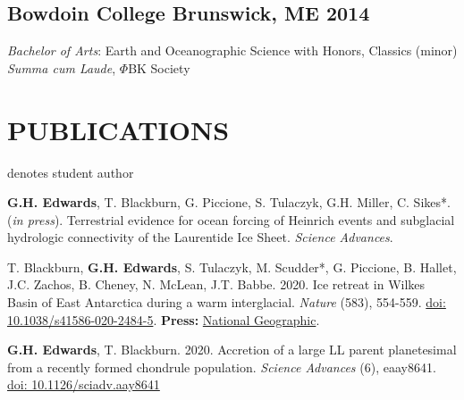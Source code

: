 \documentclass[10pt]{article}
\newcommand{\ghedwards}{\textbf{G.H. Edwards}}
\begin{document}
\subsection*{\textbf{Bowdoin College} \hspace{15pt} Brunswick, ME \hfill 2014}
\textit{Bachelor of Arts}: Earth and Oceanographic Science with Honors, Classics (minor) \\
\textit{Summa cum Laude}, $\Phi$BK Society


\section*{PUBLICATIONS}
\hfill* denotes student author
\begin{etaremune} [itemsep=4pt, leftmargin=3ex]
\item \ghedwards, T. Blackburn, G. Piccione, S. Tulaczyk, G.H. Miller, C. Sikes*. (\textit{in press}). Terrestrial evidence for ocean forcing of Heinrich events and subglacial hydrologic connectivity of the Laurentide Ice Sheet. \textit{Science Advances}.
\item T. Blackburn, \ghedwards, S. Tulaczyk, M. Scudder*, G. Piccione, B. Hallet, J.C. Zachos, B. Cheney, N. McLean, J.T. Babbe. 2020. Ice retreat in Wilkes Basin of East Antarctica during a warm interglacial. \textit{Nature} (583), 554-559. \href{https://doi.org/10.1038/s41586-020-2484-5}{doi: 10.1038/s41586-020-2484-5}. \textbf{Press:} \href{https://www.nationalgeographic.com/science/2020/07/east-antarctic-ice-sheet-more-vulnerable-to-melting-than-thought/}{National Geographic}.
\item \ghedwards, T. Blackburn. 2020. Accretion of a large LL parent planetesimal from a recently formed chondrule population. \textit{Science Advances} (6), eaay8641. \href{https://advances.sciencemag.org/content/6/16/eaay8641}{doi: 10.1126/sciadv.aay8641}

\end{etaremune}
\end{document}
